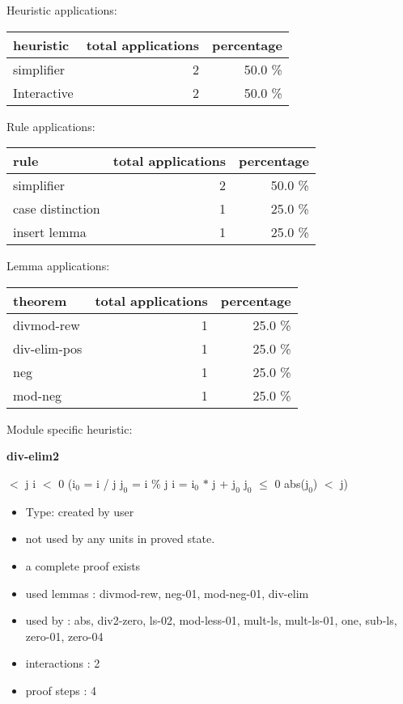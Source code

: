 \documentclass[a4paper]{article}
\begin{document}
\medskip


Heuristic applications:

\begin{supertabular}{l|r|r}
heuristic	& total applications & percentage \\ \hline
simplifier & 2 & 50.0 \% \\
Interactive & 2 & 50.0 \% \\

\end{supertabular}

Rule applications:

\begin{supertabular}{l|r|r}
rule	        & total applications & percentage \\ \hline
simplifier & 2 & 50.0 \% \\
case distinction & 1 & 25.0 \% \\
insert lemma & 1 & 25.0 \% \\

\end{supertabular}

Lemma applications:

\begin{supertabular}{l|r|r}
theorem	        & total applications & percentage \\ \hline
divmod-rew & 1 & 25.0 \% \\
div-elim-pos & 1 & 25.0 \% \\
neg & 1 & 25.0 \% \\
mod-neg & 1 & 25.0 \% \\

\end{supertabular}

Module specific heuristic:

\pagebreak

{\LARGE\bf div-elim2}\label{lemma-div-elim2}

\medskip

  $<$ j \And i $<$ 0 \Imp ($\mbox{i}_{0}$ = i / j \And $\mbox{j}_{0}$ = i \% j \Equiv i = $\mbox{i}_{0}$ $*$ j + $\mbox{j}_{0}$ \And $\mbox{j}_{0}$ $\le$ 0 \And abs($\mbox{j}_{0}$) $<$ j)

\begin{itemize}

\item Type: created by user

\item not used by any units in proved state.
\item       a complete proof exists
\item       used lemmas  : divmod-rew, neg-01, mod-neg-01, div-elim
\item       used by      : abs, div2-zero, ls-02, mod-less-01, mult-ls, mult-ls-01, one, sub-ls, zero-01, zero-04
\item       interactions : 2
\item       proof steps  : 4
\end{itemize}
\end{document}
